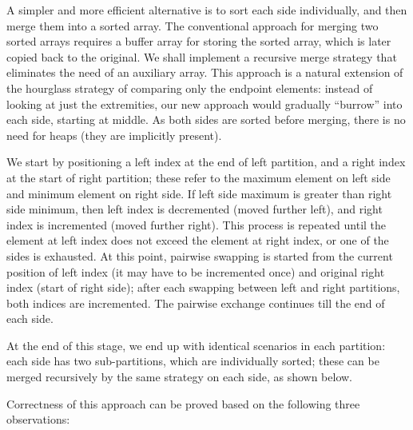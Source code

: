 A simpler and more efficient alternative is to sort each
side individually, and then merge them into a sorted array.
The conventional approach for merging two sorted arrays requires a buffer
array for storing the sorted array, which is later copied back to the original.
We shall implement a recursive merge strategy
that eliminates the need of an auxiliary array.
This approach is a natural extension of the hourglass strategy of comparing
only the endpoint elements: instead of looking at just the extremities, our
new approach would gradually ``burrow'' into each side, starting at middle.
As both sides are sorted before merging, there is
no need for heaps (they are implicitly present).

We start by positioning a left index at the end of left partition,
and a right index at the start of right partition; these refer to
the maximum element on left side and minimum element on right side.
If left side maximum is greater than right side minimum,
then left index is decremented (moved further left),
and right index is incremented (moved further right).
This process is repeated until the element at left index does not
exceed the element at right index, or one of the sides is exhausted.
At this point, pairwise swapping is started from the current
position of left index (it may have to be incremented once)
and original right index (start of right side); after each swapping
between left and right partitions, both indices are incremented.
The pairwise exchange continues till the end of each side.

At the end of this stage, we end up with identical scenarios in each partition:
each side has two sub-partitions, which are individually sorted; these can
be merged recursively by the same strategy on each side, as shown below.

\enlargethispage*{\baselineskip}


Correctness of this approach can be proved
based on the following three observations:

